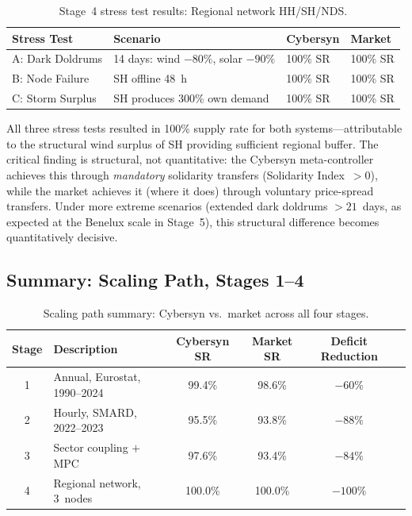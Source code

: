 \documentclass[12pt]{article}
\begin{document}
{{\begin{table}[H]
  \centering
  \caption{Stage~4 stress test results: Regional network HH/SH/NDS.}
  \label{tab:stage4}
  \begin{tabular}{p{2.8cm} p{5.5cm} p{2.3cm} p{2.3cm}}
    \toprule
    \textbf{Stress Test} & \textbf{Scenario} & \textbf{Cybersyn} & \textbf{Market} \\
    \midrule
    A: Dark Doldrums  & 14 days: wind $-80\%$, solar $-90\%$  & 100\% SR & 100\% SR \\
    B: Node Failure   & SH offline 48~h                        & 100\% SR & 100\% SR \\
    C: Storm Surplus  & SH produces 300\% own demand           & 100\% SR & 100\% SR \\
    \bottomrule
  \end{tabular}
\end{table}

All three stress tests resulted in 100\% supply rate for both systems---attributable
to the structural wind surplus of SH providing sufficient regional buffer.
The critical finding is structural, not quantitative: the Cybersyn meta-controller
achieves this through \emph{mandatory} solidarity transfers (Solidarity Index~$>0$),
while the market achieves it (where it does) through voluntary price-spread transfers.
Under more extreme scenarios (extended dark doldrums $>21$~days, as expected at the
Benelux scale in Stage~5), this structural difference becomes quantitatively decisive.

\subsection{Summary: Scaling Path, Stages 1--4}

\begin{table}[H]
  \centering
  \caption{Scaling path summary: Cybersyn vs.\ market across all four stages.}
  \label{tab:summary}
  \begin{tabular}{cp{4.5cm}cccc}
    \toprule
    \textbf{Stage} & \textbf{Description} & \textbf{Cybersyn SR} & \textbf{Market SR}
      & \textbf{Deficit Reduction} \\
    \midrule
    1 & Annual, Eurostat, 1990--2024          & 99.4\%  & 98.6\%  & $-60\%$  \\
    2 & Hourly, SMARD, 2022--2023             & 95.5\%  & 93.8\%  & $-88\%$  \\
    3 & Sector coupling $+$ MPC               & 97.6\%  & 93.4\%  & $-84\%$  \\
    4 & Regional network, 3~nodes             & 100.0\% & 100.0\% & $-100\%$ \\
    \bottomrule
  \end{tabular}
\end{table}

}}
\end{document}
